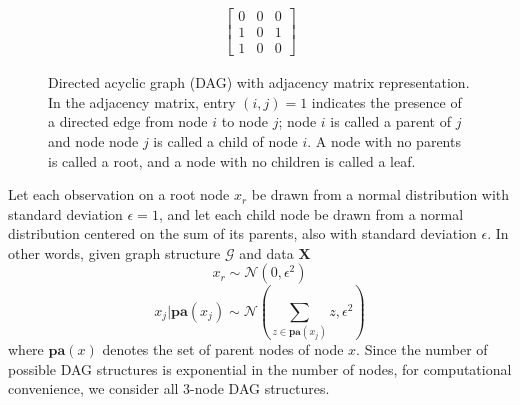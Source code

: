 \documentclass[a4paper,11pt]{article}
\begin{document}
\begin{figure}[H]
    \centering
    \begin{minipage}[b]{0.25\textwidth}
        \centering
        \usetikzlibrary{shapes.geometric}
    \end{minipage}
     \begin{minipage}[b]{0.25\textwidth}
    \begin{align*}
        \begin{bmatrix}
            0 & 0 & 0 \\
            1 & 0 & 1 \\
            1 & 0 & 0 
        \end{bmatrix}
    \end{align*}
    \vspace{2ex}
    \end{minipage}
    \caption{Directed acyclic graph (DAG) with adjacency matrix representation. In the adjacency matrix, entry $(i,j)=1$ indicates the presence of a directed edge from node $i$ to node $j$; node $i$ is called a parent of $j$ and node node $j$ is called a child of node $i$. A node with no parents is called a root, and a node with no children is called a leaf.}
    \label{fig:ex3_dag}
\end{figure}

Let each observation on a root node $x_{r}$ be drawn from a normal distribution with standard deviation $\epsilon=1$, and let each child node be drawn from a normal distribution centered on the sum of its parents, also with standard deviation $\epsilon$. In other words, given graph structure $\mathcal{G}$ and data $\mathbf{X}$
\begin{equation}
    x_{r} \sim \mathcal{N}(0, \epsilon^2)
\end{equation}
\begin{equation}
    x_{j}|\mathbf{pa}(x_{j}) \sim \mathcal{N}(\sum_{z \in \mathbf{pa}(x_{j})} z, \epsilon^2)
\end{equation}
where $\mathbf{pa}(x)$ denotes the set of parent nodes of node $x$. Since the number of possible DAG structures is exponential in the number of nodes, for computational convenience, we consider all 3-node DAG structures.
\end{document}
